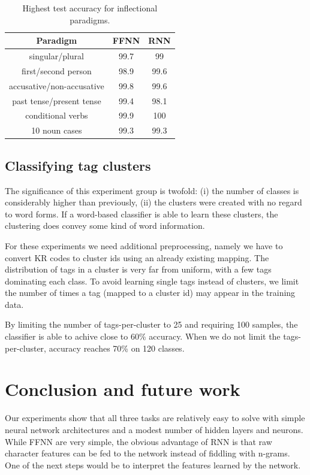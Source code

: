 \documentclass{article}
\begin{document}
\begin{table}[t]
    \caption{Highest test accuracy for inflectional paradigms.}
    \label{table:inf_paradigms}
    \centering
    \begin{tabular}{ccc}
        \toprule
        Paradigm & FFNN & RNN \\
        \midrule
        singular/plural & 99.7 & 99\\
        first/second person & 98.9 & 99.6 \\
        accusative/non-accusative & 99.8 & 99.6\\
        past tense/present tense & 99.4 & 98.1 \\
        conditional verbs & 99.9 & 100 \\
        10 noun cases & 99.3 & 99.3 \\
        \bottomrule
    \end{tabular}
\end{table}

\subsection{Classifying tag clusters}

The significance of this experiment group is twofold: (i) the number of classes is considerably higher than previously, (ii) the clusters were created with no regard to word forms.
If a word-based classifier is able to learn these clusters, the clustering does convey some kind of word information.

For these experiments we need additional preprocessing, namely we have to convert KR codes to cluster ids using an already existing mapping.
The distribution of tags in a cluster is very far from uniform, with a few tags dominating each class.
To avoid learning single tags instead of clusters, we limit the number of times a tag (mapped to a cluster id) may appear in the training data.

By limiting the number of tags-per-cluster to 25 and requiring 100 samples, the classifier is able to achive close to 60\% accuracy.
When we do not limit the tags-per-cluster, accuracy reaches 70\% on 120 classes.

\section{Conclusion and future work}

Our experiments show that all three tasks are relatively easy to solve with simple neural network architectures and a modest number of hidden layers and neurons.
While FFNN are very simple, the obvious advantage of RNN is that raw character features can be fed to the network instead of fiddling with n-grams.
One of the next steps would be to interpret the features learned by the network.
\end{document}
